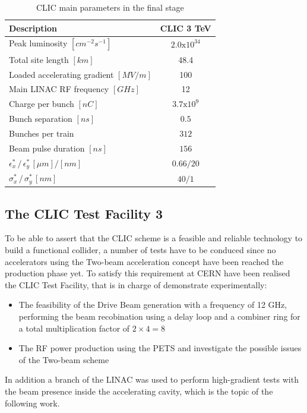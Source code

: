 \begin{table}[h]
  \centering
    \begin{tabular}{ l c  }
    \hline
    \hline
    \textbf{Description}						& \textbf{CLIC 3 TeV}	\\
    \hline
    Peak luminosity $[cm^{-2} s^{-1}]$				& $2.0\text{x}10^{34}$	\\
    Total site length $[km]$						& 48.4				\\
    Loaded accelerating gradient $[MV/m]$			& 100	\\
    Main LINAC RF frequency	$[GHz]$			& 12	\\
    Charge per bunch $ [nC]$					& $3.7\text{x}10^{9}$ \\
    Bunch separation $[ns]$					& $0.5$ \\
    Bunches per train							& $312$ \\
    Beam pulse duration $[ns]$					& $156$ \\
    $\epsilon^*_x \, / \, \epsilon^*_y \, [\mu m]/[nm]$	& $0.66/20$ \\  
    $\sigma^*_x\, / \, \sigma^*_y\, [nm]$			& $40/1$	\\
    
    \hline
    \hline
    \end{tabular}
  \caption{CLIC main parameters in the final stage}
\label{table_CLIC_params}
\end{table}







\subsection[CTF3]{The CLIC Test Facility 3}

To be able to assert that the CLIC scheme is a feasible and reliable technology to build a functional collider, a number of tests have to be conduced since no accelerators using the Two-beam acceleration concept have been reached the production phase yet. To satisfy this requirement at CERN have been realised the CLIC Test Facility, that is in charge of demonstrate experimentally:

\begin{itemize}
\item The feasibility of the Drive Beam generation with a frequency of 12 GHz, performing the beam recobination using a delay loop and a combiner ring for a total multiplication factor of $2\times4 =8$
\item The RF power production using the PETS and investigate the possible issues of the Two-beam scheme
\end{itemize}
In addition a branch of the LINAC was used to perform high-gradient tests with the beam presence inside the accelerating cavity, which is the topic of the following work.






